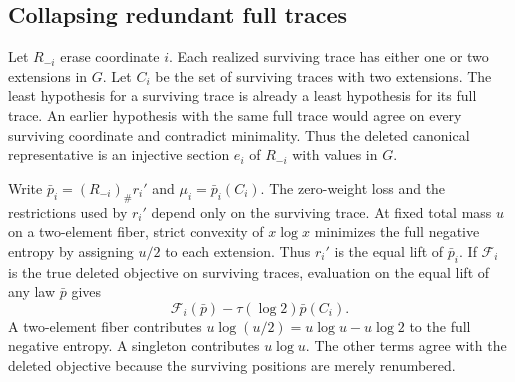\documentclass[11pt]{article}
\theoremstyle{definition}\newtheorem{definition}[theorem]{Definition}
\begin{document}
\subsection{Collapsing redundant full traces}

Let $R_{-i}$ erase coordinate $i$. Each realized surviving trace has either
one or two extensions in $G$. Let $C_i$ be the set of surviving traces with
two extensions. The least hypothesis for a surviving trace is already a least
hypothesis for its full trace. An earlier hypothesis with the same full trace
would agree on every surviving coordinate and contradict minimality. Thus the
deleted canonical representative is an injective section $e_i$ of $R_{-i}$
with values in $G$.

Write $\bar p_i=(R_{-i})_\#r_i'$ and $\mu_i=\bar p_i(C_i)$. The zero-weight loss
and the restrictions used by $r_i'$ depend only on the surviving trace. At
fixed total mass $u$ on a two-element fiber, strict convexity of $x\log x$
minimizes the full negative entropy by assigning $u/2$ to each extension.
Thus $r_i'$ is the equal lift of $\bar p_i$. If $\mathcal F_i$ is the true
deleted objective on surviving traces, evaluation on the equal lift of any
law $\bar p$ gives
\begin{equation}
  \mathcal F_i(\bar p)-\tau(\log 2)\bar p(C_i).
  \label{eq:deletion-lift-objective}
\end{equation}
A two-element fiber contributes $u\log(u/2)=u\log u-u\log2$ to the full
negative entropy. A singleton contributes $u\log u$. The other terms agree
with the deleted objective because the surviving positions are merely
renumbered.
\end{document}
